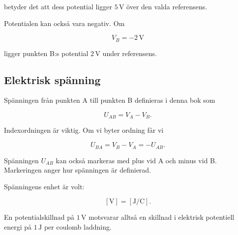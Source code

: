 \documentclass[
  swedish,
  11pt,
  a4paper,
  DIV=11,
  numbers=noendperiod,
  twoside,
  open=any]{scrreprt}
\begin{document}
betyder det att dess potential ligger \(5\,\mathrm{V}\) över den valda
referensens.

Potentialen kan också vara negativ. Om

\[
V_B = -2\,\mathrm{V}
\]

ligger punkten B:s potential \(2\,\mathrm{V}\) under referensens.

\subsection{Elektrisk spänning}\label{sec-grunder-elektrisk-spanning}

Spänningen från punkten A till punkten B definieras i denna bok som

\[
\boxed{U_{AB} = V_A - V_B}.
\]

Indexordningen är viktig. Om vi byter ordning får vi

\[
U_{BA} = V_B - V_A = -U_{AB}.
\]

Spänningen \(U_{AB}\) kan också markeras med plus vid A och minus vid B.
Markeringen anger hur spänningen är definierad.

Spänningens enhet är volt:

\[
[\mathrm{V}] = [\mathrm{J/C}].
\]

En potentialskillnad på \(1\,\mathrm{V}\) motsvarar alltså en skillnad i
elektrisk potentiell energi på \(1\,\mathrm{J}\) per coulomb laddning.
\end{document}
